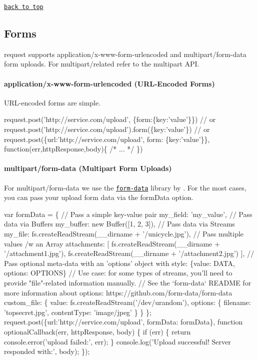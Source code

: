 \href{#table-of-contents}{\tt back to top}





\subsection*{Forms}

{\ttfamily request} supports {\ttfamily application/x-\/www-\/form-\/urlencoded} and {\ttfamily multipart/form-\/data} form uploads. For {\ttfamily multipart/related} refer to the {\ttfamily multipart} A\+PI.

\paragraph*{application/x-\/www-\/form-\/urlencoded (U\+R\+L-\/\+Encoded Forms)}

U\+R\+L-\/encoded forms are simple.


\begin{DoxyCode}
request.post('http://service.com/upload', \{form:\{key:'value'\}\})
// or
request.post('http://service.com/upload').form(\{key:'value'\})
// or
request.post(\{url:'http://service.com/upload', form: \{key:'value'\}\}, function(err,httpResponse,body)\{ /*
       ... */ \})
\end{DoxyCode}


\paragraph*{multipart/form-\/data (Multipart Form Uploads)}

For {\ttfamily multipart/form-\/data} we use the \href{https://github.com/form-data/form-data}{\tt form-\/data} library by \href{https://github.com/felixge}{\tt }. For the most cases, you can pass your upload form data via the {\ttfamily form\+Data} option.


\begin{DoxyCode}
var formData = \{
  // Pass a simple key-value pair
  my\_field: 'my\_value',
  // Pass data via Buffers
  my\_buffer: new Buffer([1, 2, 3]),
  // Pass data via Streams
  my\_file: fs.createReadStream(\_\_dirname + '/unicycle.jpg'),
  // Pass multiple values /w an Array
  attachments: [
    fs.createReadStream(\_\_dirname + '/attachment1.jpg'),
    fs.createReadStream(\_\_dirname + '/attachment2.jpg')
  ],
  // Pass optional meta-data with an 'options' object with style: \{value: DATA, options: OPTIONS\}
  // Use case: for some types of streams, you'll need to provide "file"-related information manually.
  // See the `form-data` README for more information about options: https://github.com/form-data/form-data
  custom\_file: \{
    value:  fs.createReadStream('/dev/urandom'),
    options: \{
      filename: 'topsecret.jpg',
      contentType: 'image/jpeg'
    \}
  \}
\};
request.post(\{url:'http://service.com/upload', formData: formData\}, function optionalCallback(err,
       httpResponse, body) \{
  if (err) \{
    return console.error('upload failed:', err);
  \}
  console.log('Upload successful!  Server responded with:', body);
\});
\end{DoxyCode}


